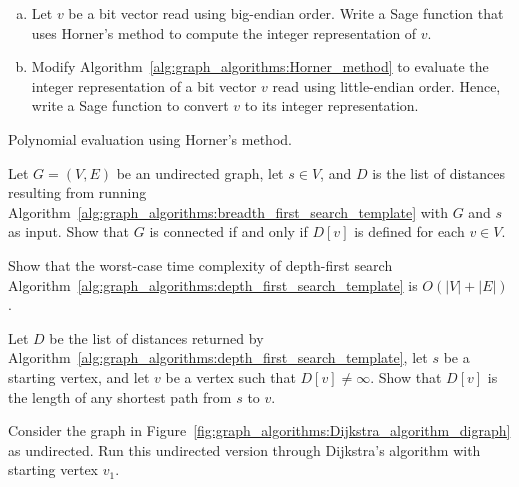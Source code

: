 \begin{problem}
\begin{enumerate}[(a)]
  \item Let $v$ be a bit vector read using big-endian order. Write a
    Sage function that uses Horner's method to compute the integer
    representation of $v$.

  \item Modify Algorithm~\ref{alg:graph_algorithms:Horner_method} to
    evaluate the integer representation of a bit vector $v$ read using
    little-endian order. Hence, write a Sage function to convert $v$
    to its integer representation.
  \end{enumerate}

\begin{algorithm}[!htbp]

\caption{Polynomial evaluation using Horner's method.}
\label{alg:graph_algorithms:Horner_method}
\end{algorithm}

\item Let $G = (V, E)$ be an undirected graph, let $s \in V$, and $D$
  is the list of distances resulting from running
  Algorithm~\ref{alg:graph_algorithms:breadth_first_search_template}
  with $G$ and $s$ as input. Show that $G$ is connected if and only if
  $D[v]$ is defined for each $v \in V$.

\item Show that the worst-case time complexity of depth-first search
  Algorithm~\ref{alg:graph_algorithms:depth_first_search_template} is
  $O(|V| + |E|)$.

\item Let $D$ be the list of distances returned by
  Algorithm~\ref{alg:graph_algorithms:depth_first_search_template},
  let $s$ be a starting vertex, and let $v$ be a vertex such that
  $D[v] \neq \infty$. Show that $D[v]$ is the length of any shortest
  path from $s$ to $v$.

\item Consider the graph in
  Figure~\ref{fig:graph_algorithms:Dijkstra_algorithm_digraph} as
  undirected. Run this undirected version through Dijkstra's algorithm
  with starting vertex $v_1$.


\end{problem}
